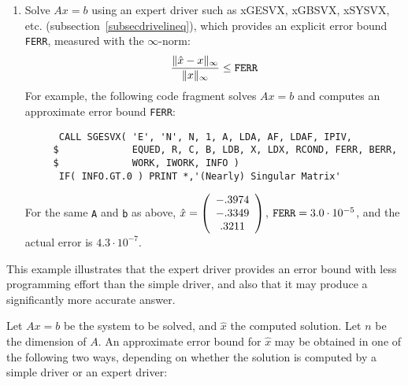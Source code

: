 {\begin{enumerate}
\item Solve $Ax=b$ using an expert driver such as xGESVX, xGBSVX,
xSYSVX, etc. (subsection~\ref{subsecdrivelineq}),
which provides an explicit error bound {\tt FERR}, measured
with the $\infty$-norm:
\[
\frac{\| \hat{x} - x \|_{\infty}}{\|x\|_{\infty}} \leq {\tt FERR}
\]
For example, the following code fragment solves
$Ax=b$ and computes an approximate error bound {\tt FERR}:

\begin{verbatim}
      CALL SGESVX( 'E', 'N', N, 1, A, LDA, AF, LDAF, IPIV,
     $             EQUED, R, C, B, LDB, X, LDX, RCOND, FERR, BERR,
     $             WORK, IWORK, INFO )
      IF( INFO.GT.0 ) PRINT *,'(Nearly) Singular Matrix'
\end{verbatim}

For the same {\tt A} and {\tt b} as above,
$\hat{x} = \bmat{c} -.3974 \\ -.3349 \\ .3211 \emat$,
${\tt FERR} = 3.0 \cdot 10^{-5}$,
and the actual error is $4.3 \cdot 10^{-7}$.

\end{enumerate}

This example illustrates
that the expert driver provides an error bound with less programming
effort than the simple driver, and also that it may produce a significantly
more accurate answer.
}

Let $Ax=b$ be the system to be solved, and $\hat{x}$ the computed
solution. Let $n$ be the dimension of $A$.
An approximate error bound
for $\hat{x}$ may be obtained in one of the following two ways,
depending on whether the solution is computed by a simple driver or
an expert driver:

